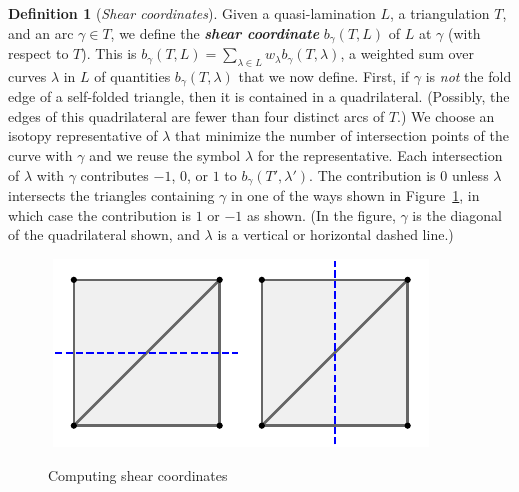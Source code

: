 \documentclass{amsart}
\theoremstyle{definition}
\newtheorem{definition}[proposition]{Definition}
\theoremstyle{remark}
\numberwithin{equation}{section}
\newcommand{\newword}[1]{\textbf{\emph{#1}}}
\newcommand{\0}{{\mathbf{0}}}
\begin{document}
\begin{definition}[\emph{Shear coordinates}]\label{shear def}
Given a quasi-lamination $L$, a triangulation $T$, and an arc $\gamma\in T$,  we define the \newword{shear coordinate} $b_\gamma(T,L)$ of $L$ at $\gamma$ (with respect to $T$).
This is $b_\gamma(T,L)=\sum_{\lambda\in L}w_\lambda b_\gamma(T,\lambda)$, a weighted sum over curves $\lambda$ in $L$ of quantities $b_\gamma(T,\lambda)$ that we now define.
First, if $\gamma$ is \emph{not} the fold edge of a self-folded triangle, then it is contained in a quadrilateral.
(Possibly, the edges of this quadrilateral are fewer than four distinct arcs of $T$.)
We choose an isotopy representative of $\lambda$ that minimize the number of intersection points of the curve with $\gamma$ and we reuse the symbol $\lambda$ for the representative.
Each intersection of $\lambda$ with $\gamma$ contributes $-1$, $0$, or $1$ to $b_\gamma(T',\lambda')$.
The contribution is $0$ unless $\lambda$ intersects the triangles containing $\gamma$ in one of the ways shown in Figure~\ref{shear fig}, in which case the contribution is $1$ or $-1$ as shown.
(In the figure, $\gamma$ is the diagonal of the quadrilateral shown, and $\lambda$ is a vertical or horizontal dashed line.)
\begin{figure}[ht]
\,\,\includegraphics{shearplus}\qquad\qquad\includegraphics{shearminus}\,\,
\caption{Computing shear coordinates}
\label{shear fig}
\end{figure}
\end{definition}
\end{document}
